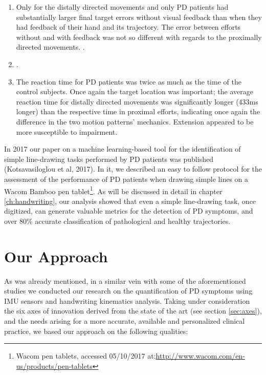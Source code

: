 \begin{enumerate}
\item Only for the distally directed movements and only \gls{PD} patients had substantially larger final target errors without visual feedback than when they had feedback of their hand and its trajectory. The error between efforts without and with feedback was not so different with regards to the proximally directed movements. . 
\item {}.
\item The reaction time for \gls{PD} patients was twice as much as the time of the control subjects. Once again the target location was important; the average reaction time for distally directed movements was significantly longer (433ms longer) than the respective time in proximal efforts, indicating once again the difference in the two motion patterns' mechanics. Extension appeared to be more susceptible to impairment.
\end{enumerate} 

In 2017 our paper on a machine learning-based tool for the identification of simple line-drawing tasks performed by \gls{PD} patients was published (Kotsavasiloglou et al, 2017). In it, we described an easy to follow protocol for the assessment of the performance of \gls{PD} patients when drawing simple lines on a Wacom Bamboo pen tablet\footnote{Wacom pen tablets, accessed 05/10/2017 at:\url{http://www.wacom.com/en-us/products/pen-tablets}}. As will be discussed in detail in chapter \ref{ch:handwriting}, our analysis showed that even a simple line-drawing task, once digitized, can generate valuable metrics for the detection of \gls{PD} symptoms, and over 80\% accurate classification of pathological and healthy trajectories. 

\section{Our Approach}
\label{sec:ourApproach}
As was already mentioned, in a similar vein with some of the aforementioned studies we conducted our research on the quantification of \gls{PD} symptoms using \gls{IMU} sensors and handwriting kinematics analysis. 
Taking under consideration the six axes of innovation derived from the state of the art (see section \ref{sec:axes}), and the needs arising for a more accurate, available and personalized clinical practice, we based our approach on the following qualities:


